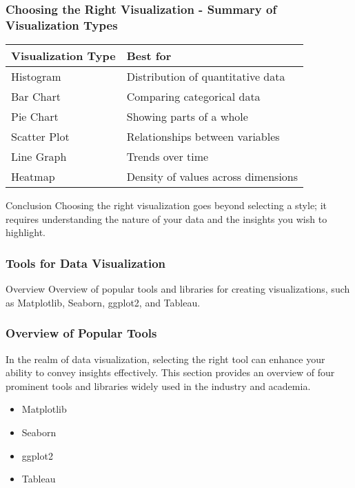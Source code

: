\documentclass[aspectratio=169]{beamer}
\begin{document}
\begin{frame}[fragile]
    \frametitle{Choosing the Right Visualization - Summary of Visualization Types}
    \begin{tabular}{|l|l|}
        \hline
        \textbf{Visualization Type} & \textbf{Best for} \\
        \hline
        Histogram & Distribution of quantitative data \\
        Bar Chart & Comparing categorical data \\
        Pie Chart & Showing parts of a whole \\
        Scatter Plot & Relationships between variables \\
        Line Graph & Trends over time \\
        Heatmap & Density of values across dimensions \\
        \hline
    \end{tabular}

    \begin{block}{Conclusion}
        Choosing the right visualization goes beyond selecting a style; it requires understanding the nature of your data and the insights you wish to highlight.
    \end{block}
\end{frame}

\begin{frame}
    \frametitle{Tools for Data Visualization}
    \begin{block}{Overview}
        Overview of popular tools and libraries for creating visualizations, such as Matplotlib, Seaborn, ggplot2, and Tableau.
    \end{block}
\end{frame}

\begin{frame}
    \frametitle{Overview of Popular Tools}
    In the realm of data visualization, selecting the right tool can enhance your ability to convey insights effectively. This section provides an overview of four prominent tools and libraries widely used in the industry and academia.

    \begin{itemize}
        \item Matplotlib
        \item Seaborn
        \item ggplot2
        \item Tableau
    \end{itemize}
\end{frame}
\end{document}
